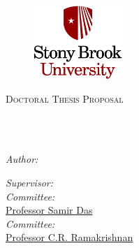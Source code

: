 \documentclass[
11pt, %
oneside, %
english, %
singlespacing, %
liststotoc, %
headsepline, %
]{MastersDoctoralThesis} %
\author{Caitao Zhan} %
\begin{document}
\frontmatter %

\pagestyle{plain} %


\begin{titlepage}
\begin{center}
\begin{figure}[!tb]
	\centering
	\includegraphics[width=0.3\textwidth]{sbu-logo.png}
	\vspace{0.2in}
\end{figure}

\textsc{\Large Doctoral Thesis Proposal}\\[0.5cm] %

\HRule \\[0.4cm] %
{\huge \bfseries \ttitle\par}\vspace{0.4cm} %
\HRule \\[1.5cm] %
 
\begin{minipage}[t]{0.4\textwidth}
\begin{flushleft} \large
\emph{Author:}\\
\href{https://caitaozhan.github.io/}{\authorname} %
\end{flushleft}
\end{minipage}
\begin{minipage}[t]{0.4\textwidth}
\begin{flushright} \large
\emph{Supervisor:} \\
\href{https://www3.cs.stonybrook.edu/~hgupta/}{\supname} %
\emph{Committee:} \\
\href{https://www3.cs.stonybrook.edu/~samir/}{Professor Samir Das} \\ %
\emph{Committee:} \\
\href{https://www3.cs.stonybrook.edu/~cram/}{Professor C.R. Ramakrishnan} %
\end{flushright}
\end{minipage}\\[3cm]


\end{center}
\end{titlepage}
\end{document}
